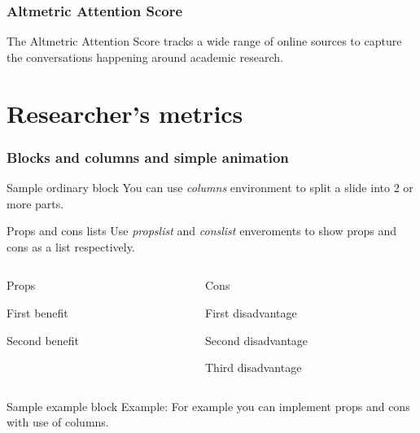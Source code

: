 \documentclass{beamer}
\begin{document}
\begin{frame}
    \frametitle{Altmetric Attention Score}
    The Altmetric Attention Score tracks a wide range of online sources to capture the conversations happening around academic research.
    

\end{frame}


\section{Researcher's metrics}

\begin{frame}
    \frametitle{Blocks and columns and simple animation}

    \begin{block}{Sample ordinary block}
        You can use \textit{columns} environment to
        split a slide into 2 or more parts.
    \end{block}

    \begin{alertblock}{Props and cons lists}
        Use \textit{propslist} and \textit{conslist} enveroments
        to show props and cons as a list respectively.
    \end{alertblock}

    \begin{columns}[T]
        \begin{column}{.5\textwidth} \pause
            \centering Props
            \begin{propslist}
                \item First benefit \pause
                \item Second benefit \pause
            \end{propslist}
        \end{column}
        \begin{column}{.5\textwidth}
            \centering Cons %
            \begin{conslist}
                \item First disadvantage \pause
                \item Second disadvantage \pause
                \item Third disadvantage \pause
            \end{conslist}
        \end{column}
    \end{columns}

    \begin{exampleblock}{Sample example block}
        Example: For example you can implement props and cons
        with use of columns.
    \end{exampleblock}

\end{frame}
\end{document}

